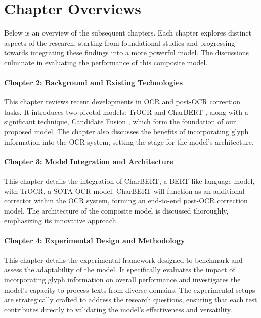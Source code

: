 \section{Chapter Overviews}
\label{sec:1_chapter_overviews}
Below is an overview of the subsequent chapters. Each chapter explores distinct aspects of the research, starting from foundational studies and progressing towards integrating these findings into a more powerful model. The discussions culminate in evaluating the performance of this composite model.

\paragraph*{Chapter 2: Background and Existing Technologies}
This chapter reviews recent developments in OCR and post-OCR correction tasks. It introduces two pivotal models: TrOCR \citep{li2023trocr} and CharBERT \citep{ma-etal-2020-charbert}, along with a significant technique, Candidate Fusion \citep{kang2021candidate}, which form the foundation of our proposed model. The chapter also discusses the benefits of incorporating glyph information into the OCR system, setting the stage for the model's architecture.

\paragraph*{Chapter 3: Model Integration and Architecture}
This chapter details the integration of CharBERT, a BERT-like language model, with TrOCR, a SOTA OCR model. CharBERT will function as an additional corrector within the OCR system, forming an end-to-end post-OCR correction model. The architecture of the composite model is discussed thoroughly, emphasizing its innovative approach.

\paragraph*{Chapter 4: Experimental Design and Methodology}
This chapter details the experimental framework designed to benchmark and assess the adaptability of the model. It specifically evaluates the impact of incorporating glyph information on overall performance and investigates the model's capacity to process texts from diverse domains. The experimental setups are strategically crafted to address the research questions, ensuring that each test contributes directly to validating the model's effectiveness and versatility.

